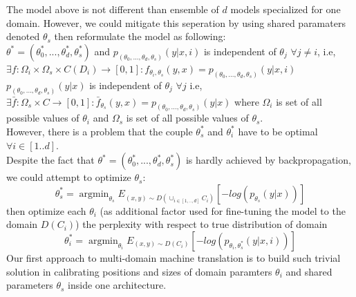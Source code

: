 \documentclass[11pt,a4paper]{article}
\DeclareMathOperator*{\argmin}{argmin}
\begin{document}
The model above is not different than ensemble of $d$ models specialized for one domain. However, we could mitigate this seperation by using shared paramaters denoted $\theta_s$ then reformulate the model as following: \\
$\theta^* = (\theta^*_{0},...,\theta^*_{d}, \theta_s^*)$ and $p_{(\theta_{0},...,\theta_d, \theta_s)}(y|x,i)$ is independent of $\theta_{j}$ $\forall j \neq i$, i.e, $\exists f:\Omega_i \times \Omega_s \times C(D_i) \rightarrow [0,1]: f_{\theta_i, \theta_s}(y,x) = p_{(\theta_{0},...,\theta_d, \theta_s)}(y|x,i)$ \\ $p_{(\theta_{0},...,\theta_d, \theta_s)}(y|x)$ is independent of $\theta_{j}$ $\forall j$ i.e, $\exists \bar{f}:\Omega_s \times C \rightarrow [0,1]: \bar{f}_{\theta_s}(y,x) = p_{(\theta_{0},...,\theta_d, \theta_s)}(y|x)$
where $\Omega_i$ is set of all possible values of $\theta_i$ and $\Omega_s$ is set of all possible values of $\theta_s$. \\
However, there is a problem that the couple $\theta_s^*$ and $\theta_i^*$ have to be optimal $\forall i \in [1..d]$.\\
Despite the fact that $\theta^* = (\theta^*_{0},...,\theta^*_{d}, \theta_s^*)$ is hardly achieved by backpropagation, we could attempt to optimize $\theta_s$:
\begin{equation}
\theta^*_{s} = \displaystyle{\mathop{\argmin}_{\theta_s}}E_{(x,y) \sim D(\displaystyle{\mathop{\cup}_{i \in [1,..,d]}}C_{i})}[-log(p_{\theta_s}(y|x))]
\end{equation} 
then optimize each $\theta_i$ (as additional factor used for fine-tuning the model to the domain $D(C_{i})$) the perplexity with respect to true distribution of domain
\begin{equation}
\theta^*_{i} = \displaystyle{\mathop{\argmin}_{\theta_i}}E_{(x,y) \sim D(C_{i})}[-log(p_{\theta_i,\theta^*_s}(y|x,i))]
\end{equation} 
Our first approach to multi-domain machine translation is to build such trivial solution in calibrating positions and sizes of domain paramters $\theta_i$ and shared parameters $\theta_s$ inside one architecture.
\end{document}
